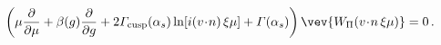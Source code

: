 \begin{equation}
\left(
\mu \frac{\partial}{\partial\mu}
+
\beta (g) \frac{\partial}{\partial g}
+
2 {\mit\Gamma}_{\rm cusp} (\alpha_s) \ln[ i (v \!\cdot\! n) \, \xi \mu]
+
{\mit\Gamma} (\alpha_s)
\right)
\vev{ W_{\scriptstyle\Pi} ( {v \!\cdot\! n} \, \xi \mu) }
=
0
\, .
\label{RG-light}
\end{equation}

